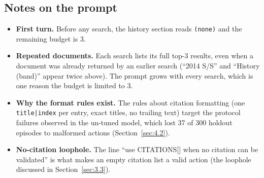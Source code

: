 \subsection{Notes on the prompt}\label{notes-on-the-prompt}

\begin{itemize}
\tightlist
\item
  \textbf{First turn.} Before any search, the history section reads
  \texttt{(none)} and the remaining budget is 3.
\item
  \textbf{Repeated documents.} Each search lists its full top-3 results,
  even when a document was already returned by an earlier search (``2014
  S/S'' and ``History (band)'' appear twice above). The prompt grows
  with every search, which is one reason the budget is limited to 3.
\item
  \textbf{Why the format rules exist.} The rules about citation
  formatting (one \texttt{title|index} per entry, exact titles, no
  trailing text) target the protocol failures observed in the un-tuned
  model, which lost 37 of 300 holdout episodes to malformed actions
  (Section~\ref{sec:4.2}).
\item
  \textbf{No-citation loophole.} The line ``use CITATIONS{[}{]} when no
  citation can be validated'' is what makes an empty citation list a
  valid action (the loophole discussed in Section~\ref{sec:3.3}).
\end{itemize}
